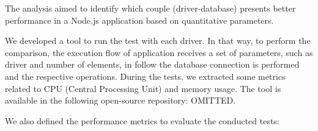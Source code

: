 \documentclass{svproc}
\begin{document}



The analysis aimed to identify which couple (driver-database) presents better performance in a Node.js application based on quantitative parameters.

We developed a tool to run the test with each driver. In that way, to perform the comparison, the execution flow of application receives a set of parameters, such as driver and number of elements, in follow the database connection is performed and the respective operations. During the tests, we extracted some metrics related to CPU (Central Processing Unit) and memory usage. 
The tool is available in the following open-source repository: OMITTED.

We also defined the performance metrics to evaluate the conducted tests:



\end{document}
